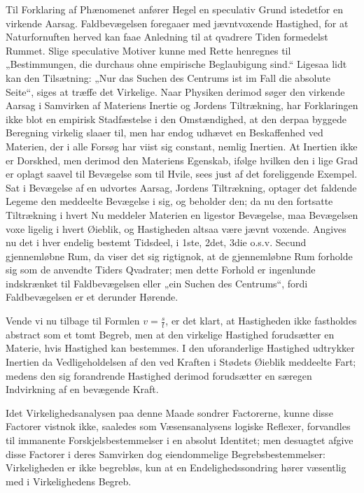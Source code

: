 \documentclass[12pt]{book}
\newcommand{\opage}[1]{\marginnote{\footnotesize\textit{[#1]}}}
\begin{document}
Til Forklaring af Phænomenet anfører Hegel en speculativ Grund istedetfor en
virkende Aarsag. Faldbevægelsen foregaaer med jævntvoxende Hastighed, for at
Naturfornuften herved kan faae Anledning til at qvadrere Tiden formedelst
Rummet. Slige speculative Motiver kunne med Rette henregnes til „Bestimmungen,
die durchaus ohne empirische Beglaubigung sind.“ Ligesaa lidt kan den
Tilsætning: „Nur das Suchen des Centrums ist im Fall die absolute Seite“, siges
at træffe det Virkelige. Naar Physiken derimod søger den virkende Aarsag i
Samvirken af Materiens Inertie og Jordens Tiltrækning, har Forklaringen ikke blot
en empirisk Stadfæstelse i den Omstændighed, at den derpaa byggede Beregning
virkelig slaaer til, men har endog udhævet en Beskaffenhed ved Materien, der i
alle Forsøg har viist sig constant, nemlig Inertien. At Inertien ikke er
Dorskhed, men derimod den Materiens Egenskab, ifølge hvilken den i lige
\opage{165} Grad er oplagt saavel til Bevægelse som til Hvile, sees just af det foreliggende
Exempel. Sat i Bevægelse af en udvortes Aarsag, Jordens Tiltrækning, optager det
faldende Legeme den meddeelte Bevægelse i sig, og beholder den; da nu den
fortsatte Tiltrækning i hvert Nu meddeler Materien en ligestor Bevægelse, maa
Bevægelsen voxe ligelig i hvert Øieblik, og Hastigheden altsaa være jævnt
voxende. Angives nu det i hver endelig bestemt Tidsdeel, i 1ste, 2det, 3die
o.s.v. Secund gjennemløbne Rum, da viser det sig rigtignok, at de gjennemløbne
Rum forholde sig som de anvendte Tiders Qvadrater; men dette Forhold er
ingenlunde indskrænket til Faldbevægelsen eller „ein Suchen des Centrums“,
fordi Faldbevægelsen er et derunder Hørende.

Vende vi nu tilbage til Formlen $v = \frac{s}{t}$, er det klart, at Hastigheden
ikke fastholdes abstract som et tomt Begreb, men at den virkelige Hastighed
forudsætter en Materie, hvis Hastighed kan bestemmes. I den uforanderlige
Hastighed udtrykker Inertien da Vedligeholdelsen af den ved Kraften i Stødets
Øieblik meddeelte Fart; medens den sig forandrende Hastighed derimod forudsætter
en særegen Indvirkning af en bevægende Kraft.

Idet Virkelighedsanalysen paa denne Maade sondrer Factorerne, kunne disse
Factorer vistnok ikke, saaledes som Væsensanalysens logiske Reflexer, forvandles
til immanente Forskjelsbestemmelser i en absolut Identitet; men desuagtet afgive
disse Factorer i deres Samvirken dog eiendommelige Begrebsbestemmelser:
Virkeligheden er ikke begrebløs, kun at en Endelighedssondring hører væsentlig
med i Virkelighedens Begreb.
\end{document}

